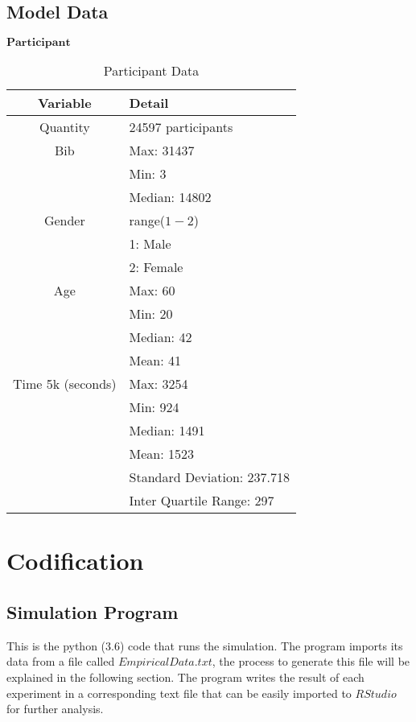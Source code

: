 \documentclass[11pt, oneside]{article}   	%
\begin{document}
\subsection{Model Data}

$\textbf{Participant}$


\begin{table}[H]
\caption{Participant Data}
\begin{center}
 \begin{tabular}{|c|l|}
 \hline
  Variable & Detail\\ 
  \hline \hline
  Quantity & 24597 participants\\
  Bib &  Max: 31437\\
  &  Min: 3\\
   &  Median: 14802\\
  Gender & range($1 - 2$)\\
   & 1: Male\\
   & 2: Female\\
   Age & Max: 60\\
    & Min: 20\\
    & Median: 42\\
    & Mean: 41\\
    Time 5k (seconds) & Max: 3254\\
     & Min: 924\\
     & Median: 1491\\
     & Mean: 1523\\
     & Standard Deviation: 237.718\\
     & Inter Quartile Range: 297\\
 \hline
\end{tabular}
\end{center}
\label{table: participant data}
\end{table}

\section{Codification}

\subsection{Simulation Program}
This is the python (3.6) code that runs the simulation. The program imports its data from a file called $EmpiricalData.txt$, the process to generate this file will be explained in the following section. The program writes the result of each experiment in a corresponding text file that can be easily imported to $RStudio$ for further analysis.
\end{document}
